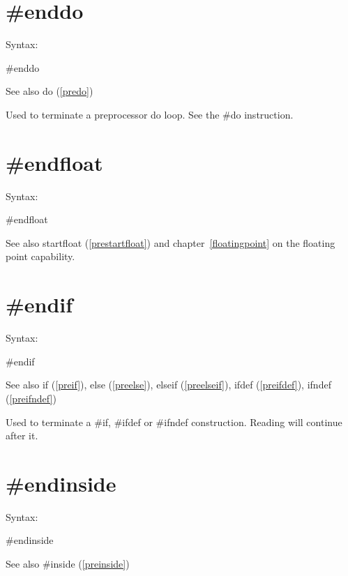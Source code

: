 
\section{\#enddo}
\label{preenddo}

\noindent Syntax:

\#enddo
 
\noindent See also do (\ref{predo})

\noindent Used to terminate a preprocessor 
do loop. See the \#do instruction.


\section{\#endfloat}
\label{preendfloat}

\noindent Syntax:

\#endfloat

\noindent See also startfloat (\ref{prestartfloat}) and chapter~\ref{floatingpoint} on the floating point capability.
 

\section{\#endif}
\label{preendif}

\noindent Syntax:

\#endif
 
\noindent See also if (\ref{preif}),
            else (\ref{preelse}),
            elseif (\ref{preelseif}),
            ifdef (\ref{preifdef}),
            ifndef (\ref{preifndef})

\noindent Used to terminate a \#if, 
\#ifdef or \#ifndef construction. 
Reading will continue after it.


\section{\#endinside}
\label{preendinside}

\noindent Syntax:

\#endinside
 
\noindent See also \#inside (\ref{preinside})

